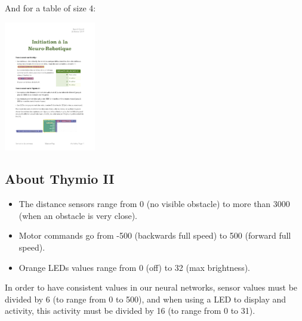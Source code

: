 \documentclass[12pt]{article}
\begin{document}
And for a table of size 4:

\begin{center}
\includegraphics[width=0.3\textwidth]{../StructureTableau.pdf}
\end{center}

\subsection*{About Thymio II}
\begin{itemize}
    \item The distance sensors range from 0 (no visible obstacle) to more than 3000 (when an obstacle is very close).
    \item Motor commands go from -500 (backwards full speed) to 500 (forward full speed).
    \item Orange LEDs values range from 0 (off) to 32 (max brightness).
\end{itemize}

In order to have consistent values in our neural networks, sensor values must be divided by 6 (to range from 0 to 500), and when using a LED to display and activity, this activity must be divided by 16 (to range from 0 to 31).
\end{document}
